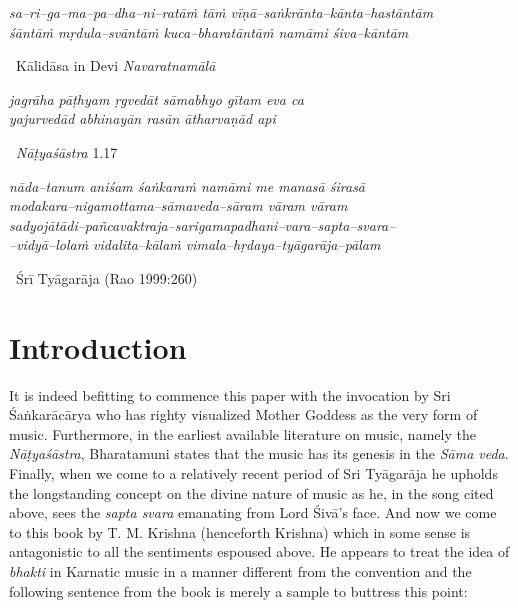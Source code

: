 \begin{myquote}
\textit{sa–ri–ga–ma–pa–dha–ni–ratāṁ tāṁ vīṇā–saṅkrānta–kānta–hastāntām }\\\textit{śāntāṁ mṛdula–svāntāṁ kuca–bharatāntāṁ namāmi śiva–kāntām} 

~\hfill Kālidāsa in Devi \textit{Navaratnamālā}
\end{myquote}

\begin{myquote}
\textit{jagrāha pāṭhyam ṛgvedāt sāmabhyo gītam eva ca }\\\textit{yajurvedād abhinayān rasān ātharvaṇād api } 

~\hfill \textit{Nāṭyaśāstra} 1.17
\end{myquote}

\begin{myquote}
\textit{nāda–tanum aniśam śaṅkaraṁ namāmi me manasā śirasā}\\\textit{modakara–nigamottama–sāmaveda–sāram vāram vāram}\\\textit{sadyojātādi–pañcavaktraja–sarigamapadhani–vara–sapta–svara–}\\\textit{–vidyā–lolaṁ vidalita–kālaṁ vimala–hṛdaya–tyāgarāja–pālam} 

~\hfill Śrī Tyāgarāja (Rao 1999:260)
\end{myquote}

\vspace{-.4cm}

\section*{Introduction}

It is indeed befitting to commence this paper with the invocation by Sri Śaṅkarācārya who has righty visualized Mother Goddess as the very form of music. Furthermore, in the earliest available literature on music, namely the \textit{Nāṭyaśāstra}, Bharatamuni states that the music has its genesis in the \textit{Sāma veda}. Finally, when we come to a relatively recent period of Sri Tyāgarāja he upholds the longstanding concept on the divine nature of music as he, in the song cited above, sees the \textit{sapta svara} emanating from Lord Śivā’s face. And now we come to this book by T. M. Krishna (henceforth Krishna) which in some sense is antagonistic to all the sentiments espoused above. He appears to treat the idea of \textit{bhakti} in Karnatic music in a manner different from the convention and the following sentence from the book is merely a sample to buttress this point:

